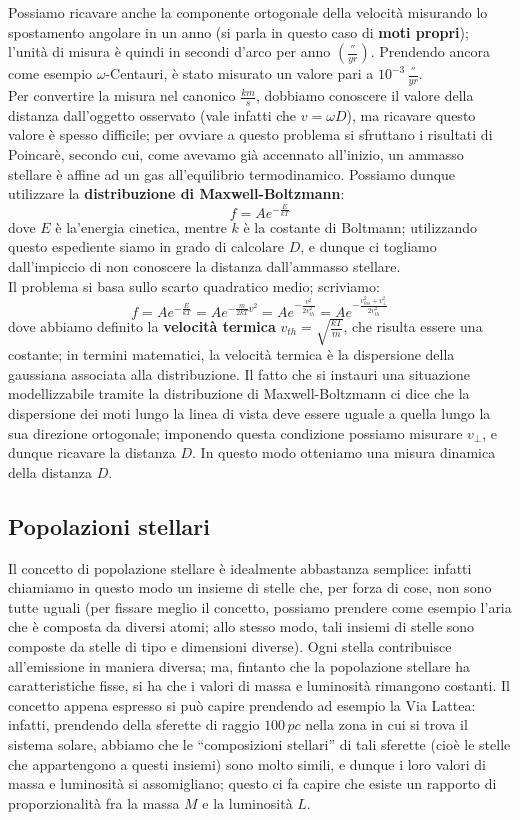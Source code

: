 Possiamo ricavare anche la componente ortogonale della velocità misurando lo spostamento angolare in un anno (si parla in questo caso di \textbf{moti propri}); l'unità di misura è quindi in secondi d'arco per anno $\left(\frac{''}{yr}\right)$. Prendendo ancora come esempio $\omega$-Centauri, è stato misurato un valore pari a $10^{-3} \, \frac{''}{yr}$.\\
Per convertire la misura nel canonico $\frac{km}{s}$, dobbiamo conoscere il valore della distanza dall'oggetto osservato (vale infatti che $v=\omega D$), ma ricavare questo valore è spesso difficile; per ovviare a questo problema si sfruttano i risultati di Poincarè, secondo cui, come avevamo già accennato all'inizio, un ammasso stellare è affine ad un gas all'equilibrio termodinamico. Possiamo dunque utilizzare la \textbf{distribuzione di Maxwell-Boltzmann}:
$$f=A e^{-\frac{E}{kT}}$$
dove $E$ è la'energia cinetica, mentre $k$ è la costante di Boltmann; utilizzando questo espediente siamo in grado di calcolare $D$, e dunque ci togliamo dall'impiccio di non conoscere la distanza dall'ammasso stellare.\\
Il problema si basa sullo scarto quadratico medio; scriviamo:
$$f=A e^{-\frac{E}{kT}}=A e^{-\frac{m}{2kT} v^2}= A e^{-\frac{v^2}{2 v_{th} ^2}} = A e^{-\frac{v_{los} ^2 + v_{\perp} ^2}{2 v_{th} ^2}}$$
dove abbiamo definito la \textbf{velocità termica} $v_{th}=\sqrt{\frac{kT}{m}}$, che risulta essere una costante; in termini matematici, la velocità termica è la dispersione della gaussiana associata alla distribuzione. Il fatto che si instauri una situazione modellizzabile tramite la distribuzione di Maxwell-Boltzmann ci dice che la dispersione dei moti lungo  la linea di vista deve essere uguale a  quella lungo la sua direzione ortogonale; imponendo questa condizione possiamo misurare $v_{\perp}$, e dunque ricavare la distanza $D$. In questo modo otteniamo una misura dinamica della distanza $D$.

\subsection{Popolazioni stellari}
Il concetto di popolazione stellare è idealmente abbastanza semplice: infatti chiamiamo in questo modo un insieme di stelle che, per forza di cose, non sono tutte uguali (per fissare meglio il concetto, possiamo prendere come esempio l'aria che è composta da diversi atomi; allo stesso modo, tali insiemi di stelle sono composte da stelle di tipo e dimensioni diverse). Ogni stella contribuisce all'emissione in maniera diversa; ma, fintanto che la popolazione stellare ha caratteristiche fisse, si ha che i valori di massa e luminosità rimangono costanti. Il concetto appena espresso si può capire prendendo ad esempio la Via Lattea: infatti, prendendo della sferette di raggio $100 \, pc$ nella zona in cui si trova il sistema solare, abbiamo che le ``composizioni stellari'' di tali sferette (cioè le stelle che appartengono a questi insiemi) sono molto simili, e dunque i loro valori di massa e luminosità si assomigliano; questo ci fa capire che esiste un rapporto di proporzionalità fra la massa $M$ e la luminosità $L$.

